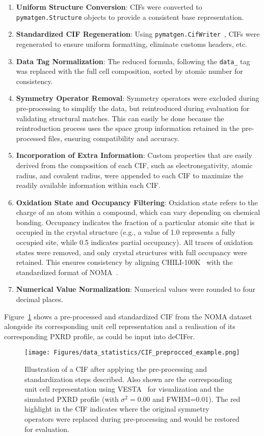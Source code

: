 \begin{enumerate}
    \item \textbf{Uniform Structure Conversion}: CIFs were converted to \texttt{pymatgen.Structure} \cite{Ong2013} objects to provide a consistent base representation.
    \item \textbf{Standardized CIF Regeneration}: Using \texttt{pymatgen.CifWriter}~\cite{Ong2013}, CIFs were regenerated to ensure uniform formatting, eliminate customs headers, etc.
    \item \textbf{Data Tag Normalization}: The reduced formula, following the \texttt{data\_} tag was replaced with the full cell composition, sorted by atomic number for consistency.
    \item \textbf{Symmetry Operator Removal}: Symmetry operators were excluded during pre-processing to simplify the data, but reintroduced during evaluation for validating structural matches. This can easily be done because the reintroduction process uses the space group information retained in the pre-processed files, ensuring compatibility and accuracy.
    \item \textbf{Incorporation of Extra Information}: Custom properties that are easily derived from the composition of each CIF, such as electronegativity, atomic radius, and covalent radius, were appended to each CIF to maximize the readily available information within each CIF.
    \item \textbf{Oxidation State and Occupancy Filtering}: Oxidation state refers to the charge of an atom within a compound, which can vary depending on chemical bonding. Occupancy indicates the fraction of a particular atomic site that is occupied in the crystal structure (e.g., a value of 1.0 represents a fully occupied site, while 0.5 indicates partial occupancy). All traces of oxidation states were removed, and only crystal structures with full occupancy were retained. This ensures consistency by aligning CHILI-100K~\cite{FriisJensenJohansen2024} with the standardized format of NOMA~\cite{antunes2024crystalstructuregenerationautoregressive}.
    \item \textbf{Numerical Value Normalization}: Numerical values were rounded to four decimal places.
\end{enumerate}

Figure~\ref{sup-fig:preprocessed_standardized_cif} shows a pre-processed and standardized CIF from the NOMA dataset alongside its corresponding unit cell representation and a realisation of its corresponding PXRD profile, as could be input into deCIFer.
\begin{figure}[ht!]
    \centerline{\texttt{[image: Figures/data\_statistics/CIF\_preprocced\_example.png]}}
    \caption{Illustration of a CIF after applying the pre-processing and standardization steps described. Also shown are the corresponding unit cell representation using VESTA~\cite{VESTA} for visualization and the simulated PXRD profile (with $\sigma^2=0.00$ and FWHM=0.01). The red highlight in the CIF indicates where the original symmetry operators were replaced during pre-processing and would be restored for evaluation.}
    \label{sup-fig:preprocessed_standardized_cif}
\end{figure}

